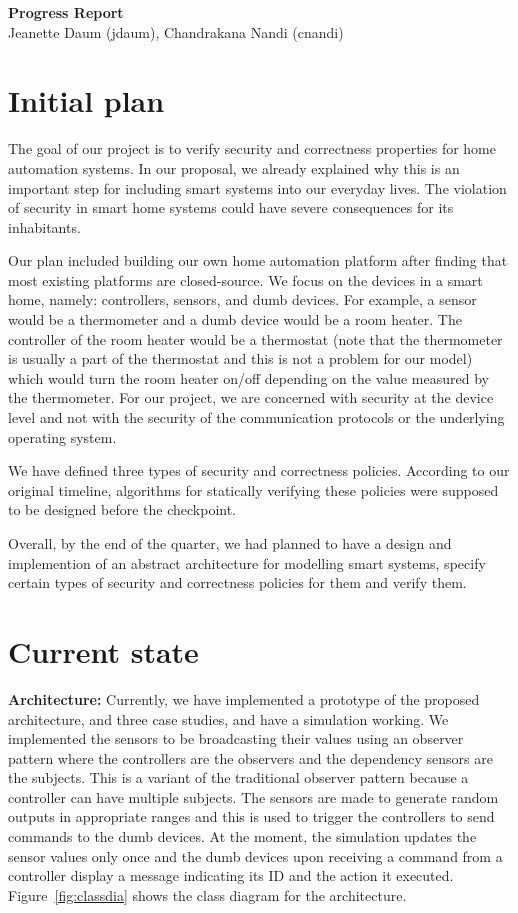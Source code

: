 \documentclass{article}
\begin{document}
\begin{center}
\large \textbf{Progress Report}\\
\normalsize {Jeanette Daum (jdaum), Chandrakana Nandi (cnandi) }
\end{center}
\section{Initial plan}
The goal of our project is to verify security and correctness properties for home automation systems. In our proposal, we already explained why this is an important step for including smart systems into our everyday lives. The violation of security in smart home systems could have severe consequences for its inhabitants. 

Our plan included building our own home automation platform after finding that most existing platforms are closed-source. We focus on the devices in a smart home, namely: controllers, sensors, and dumb devices. For example, a sensor would be a thermometer and a dumb device would be a room heater. The controller of the room heater would be a thermostat (note that the thermometer is usually a part of the thermostat and this is not a problem for our model) which would turn the room heater on/off depending on the value measured by the thermometer. For our project, we are concerned with security at the device level and not with the security of the communication protocols or the underlying operating system. 

We have defined three types of security and correctness policies. According to our original timeline, algorithms for statically verifying these policies were supposed to be designed before the checkpoint.

Overall, by the end of the quarter, we had planned to have a design and implemention of an abstract architecture for modelling smart systems, specify certain types of security and correctness policies for them and verify them. 

\section{Current state}
\textbf{Architecture:} Currently, we have implemented a prototype of the proposed architecture, and three case studies, and have a simulation working. We implemented the sensors to be broadcasting their values using an observer pattern where the controllers are the observers and the dependency sensors are the subjects. This is a variant of the traditional observer pattern because a controller can have multiple subjects. The sensors are made to generate random outputs in appropriate ranges and this is used to trigger the controllers to send commands to the dumb devices.  At the moment, the simulation updates the sensor values only once and the dumb devices upon receiving a command from a controller display a message indicating its ID and the action it executed. Figure~\ref{fig:classdia} shows the class diagram for the architecture. 
\end{document}
